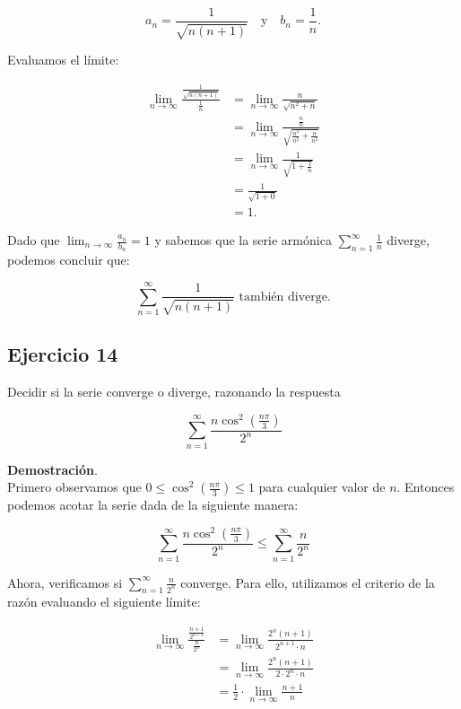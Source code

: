\documentclass{article}
\begin{document}
    \[
    a_n = \frac{1}{\sqrt{n(n+1)}} \quad \text{y} \quad b_n = \frac{1}{n}.
    \]

    Evaluamos el límite:

    \begin{align*}
    \lim _{n \rightarrow \infty} \frac{\frac{1}{\sqrt{n(n+1)}}}{\frac{1}{n}} &= \lim _{n \rightarrow \infty} \frac{n}{\sqrt{n^2 + n}} \\
    &= \lim _{n \rightarrow \infty} \frac{\frac{n}{n}}{\sqrt{\frac{n^2}{n^2} + \frac{n}{n^2}}} \\
    &= \lim _{n \rightarrow \infty} \frac{1}{\sqrt{1 + \frac{1}{n}}} \\
    &= \frac{1}{\sqrt{1 + 0}} \\
    &= 1.
    \end{align*}

    Dado que \(\lim _{n \rightarrow \infty} \frac{a_n}{b_n} = 1\) y sabemos que la serie armónica \(\sum_{n=1}^{\infty} \frac{1}{n}\) diverge, podemos concluir que:

    \[
    \sum_{n=1}^{\infty} \frac{1}{\sqrt{n(n+1)}} \text{ también diverge.}
    \]

    \subsection*{Ejercicio 14}

    Decidir si la serie converge o diverge, razonando la respuesta

    $$
    \sum_{n=1}^{\infty} \frac{n \cos ^{2}\left(\frac{n \pi}{3}\right)}{2^{n}}
    $$

    \textbf{Demostración}.\\

    Primero observamos que $0 \leq \cos ^{2}\left(\frac{n \pi}{3}\right) \leq 1$ para cualquier valor de $n$. Entonces podemos acotar la serie dada de la siguiente manera:

    $$
    \sum_{n=1}^{\infty} \frac{n \cos ^{2}\left(\frac{n \pi}{3}\right)}{2^{n}} \leq \sum_{n=1}^{\infty} \frac{n}{2^{n}}
    $$

    Ahora, verificamos si $\sum_{n=1}^{\infty} \frac{n}{2^{n}}$ converge. Para ello, utilizamos el criterio de la razón evaluando el siguiente límite:

    \begin{align*}
    \lim _{n \rightarrow \infty} \frac{\frac{n+1}{2^{n+1}}}{\frac{n}{2^{n}}} &= \lim _{n \rightarrow \infty} \frac{2^{n}(n+1)}{2^{n+1} \cdot n} \\
    &= \lim _{n \rightarrow \infty} \frac{2^{n}(n+1)}{2 \cdot 2^{n} \cdot n} \\
    &= \frac{1}{2} \cdot \lim _{n \rightarrow \infty} \frac{n+1}{n}
    \end{align*}
\end{document}
